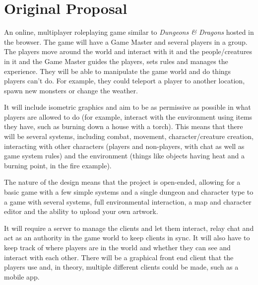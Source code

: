 \chapter{Original Proposal}\label{appendix:designspec}

An online, multiplayer roleplaying game similar to \textit{Dungeons \& Dragons} hosted in the browser. The game will have a Game Master and several players in a group. The players move around the world and interact with it and the people/creatures in it and the Game Master guides the players, sets rules and manages the experience. They will be able to manipulate the game world and do things players can't do. For example, they could teleport a player to another location, spawn new monsters or change the weather.

It will include isometric graphics and aim to be as permissive as possible in what players are allowed to do (for example, interact with the environment using items they have, such as burning down a house with a torch). This means that there will be several systems, including combat, movement, character/creature creation, interacting with other characters (players and non-players, with chat as well as game system rules) and the environment (things like objects having heat and a burning point, in the fire example).

The nature of the design means that the project is open-ended, allowing for a basic game with a few simple systems and a single dungeon and character type to a game with several systems, full environmental interaction, a map and character editor and the ability to upload your own artwork.

It will require a server to manage the clients and let them interact, relay chat and act as an authority in the game world to keep clients in sync. It will also have to keep track of where players are in the world and whether they can see and interact with each other. There will be a graphical front end client that the players use and, in theory, multiple different clients could be made, such as a mobile app.